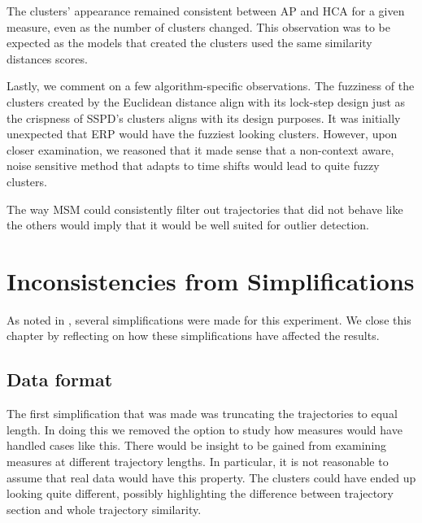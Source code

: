 The clusters' appearance remained consistent between AP and HCA for a given measure, even as the number of clusters changed. 
This observation was to be expected as the models that created the clusters used the same similarity distances scores. 

Lastly, we comment on a few algorithm-specific observations. 
The fuzziness of the clusters created by the Euclidean distance align with its lock-step design just as the crispness of SSPD’s clusters aligns with its design purposes. 
It was initially unexpected that ERP would have the fuzziest looking clusters. However, upon closer examination, we reasoned that it made sense that a non-context aware, noise sensitive method that adapts to time shifts would lead to quite fuzzy clusters. 

The way MSM could consistently filter out trajectories that did not behave like the others would imply that it would be well suited for outlier detection. 




\section{Inconsistencies from Simplifications}
As noted in , several simplifications were made for this experiment.
We close this chapter by reflecting on how these simplifications have affected the results.


\subsection{Data format}

The first simplification that was made was truncating the trajectories to equal length.
In doing this we removed the option to study how measures would have handled cases like this.
There would be insight to be gained from examining measures at different trajectory lengths. 
In particular, it is not reasonable to assume that real data would have this property. 
The clusters could have ended up looking quite different, possibly highlighting the difference between trajectory section and whole trajectory similarity.

